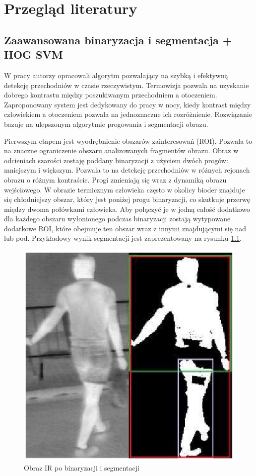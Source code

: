 \chapter{Przegląd literatury}
\label{cha:przegLiter}


\section{Zaawansowana binaryzacja i segmentacja + HOG SVM} %
W pracy \cite{kolzpoz} autorzy opracowali algorytm pozwalający na szybką i efektywną detekcję przechodniów w czasie rzeczywistym.
Termowizja pozwala na uzyskanie dobrego kontrastu między poszukiwanym przechodniem a otoczeniem.
Zaproponowany system jest dedykowany do pracy w nocy, kiedy kontrast między człowiekiem a otoczeniem pozwala na jednoznaczne ich rozróżnienie. %
Rozwiązanie bazuje na ulepszonym algorytmie progowania i segmentacji obrazu.

Pierwszym etapem jest wyodrębnienie obszarów zainteresowań (ROI).
Pozwala to na znaczne ograniczenie obszaru analizowanych fragmentów obrazu. %
Obraz w odcieniach szarości zostaję poddany binaryzacji z użyciem dwóch progów: mniejszym i większym. Pozwala to na detekcję przechodniów w różnych rejonach obrazu o różnym kontraście.
Progi zmieniają się wraz z dynamiką obrazu wejściowego.
W obrazie termicznym człowieka często w okolicy bioder znajduje się chłodniejszy obszar, który jest poniżej progu binaryzacji, co skutkuje przerwę między dwoma połówkami człowieka. Aby połączyć je w jedną całość dodatkowo dla każdego obszaru wyłonionego podczas binaryzacji zostają wytypowane dodatkowe ROI, które obejmuje ten obszar wraz z innymi znajdującymi się nad lub pod. Przykładowy wynik segmentacji jest zaprezentowany na rysunku \ref{fig:S_IR}.

\begin{figure}
\centering
\includegraphics[width=0.4\linewidth]{images/S_IR}
\caption[Obraz IR po binaryzacji i segmentacji.]{Obraz IR po binaryzacji i segmentacji \cite{kolzpoz}}
\label{fig:S_IR}
\end{figure}

